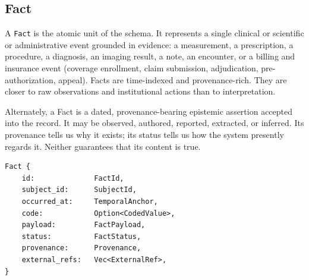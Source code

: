 \documentclass[11pt]{article}
\begin{document}
\begin{center}
\end{center}

\subsection{Fact}

A \texttt{Fact} is the atomic unit of the schema. It represents a single
clinical or scientific or administrative event grounded in evidence: a measurement, a
prescription, a procedure, a diagnosis, an imaging result, a note, an
encounter, or a billing and insurance event (coverage enrollment, claim
submission, adjudication, pre-authorization, appeal). Facts are time-indexed
and provenance-rich. They are closer to raw observations and institutional
actions than to interpretation.

Alternately, a Fact is a dated, provenance-bearing epistemic assertion accepted
into the record. It may be observed, authored, reported, extracted, or inferred.
Its provenance tells us why it exists; its status tells us how the system presently
regards it. Neither guarantees that its content is true.

\begin{lstlisting}
Fact {
    id:              FactId,
    subject_id:      SubjectId,
    occurred_at:     TemporalAnchor,
    code:            Option<CodedValue>,
    payload:         FactPayload,
    status:          FactStatus,
    provenance:      Provenance,
    external_refs:   Vec<ExternalRef>,
}
\end{lstlisting}
\end{document}

